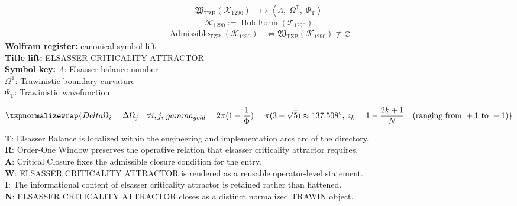 \noindent
\begin{minipage}[t]{0.48\linewidth}
\begingroup
\small
\[
\begin{aligned}
\mathfrak{W}_{\mathrm{TZP}}\!\left(\mathcal{K}_{1290}\right)
&\longmapsto
\left\langle \Lambda,\; \Omega^{\mathbb{T}},\; \Psi_{\mathrm{T}} \right\rangle
\end{aligned}
\]
\[
\mathcal{K}_{1290}
:=
\operatorname{HoldForm}\!\left(\mathcal{T}_{1290}\right)
\]
\[
\begin{aligned}
\operatorname{Admissible}_{\mathrm{TZP}}\!\left(\mathcal{K}_{1290}\right)
&\Longleftrightarrow
\mathfrak{W}_{\mathrm{TZP}}\!\left(\mathcal{K}_{1290}\right)\not\equiv\varnothing
\end{aligned}
\]
\textbf{Wolfram register:} canonical symbol lift\\
\textbf{Title lift:} ELSASSER CRITICALITY ATTRACTOR\\
\textbf{Symbol key:} \(\Lambda\): Elsasser balance number\\ \(\Omega^{\mathbb{T}}\): Trawinistic boundary curvature\\ \(\Psi_{\mathrm{T}}\): Trawinistic wavefunction
\par
\endgroup
\end{minipage}\hfill
\begin{minipage}[t]{0.48\linewidth}
\[
\tzpnormalizewrap{Delta \Omega_i = \Delta \Omega_j \quad \forall i, j,\,gamma_{gold} = 2\pi (1 - \frac{1}{\Phi}) = \pi(3 - \sqrt{5}) \approx 137.508^\circ,\,z_k = 1 - \frac{2k+1}{N} \quad (\text{ranging from } +1 \text{ to } -1)}
\]

\small
\textbf{T}: Elsasser Balance is localized within the engineering and implementation arcs arc of the directory.\\
\textbf{R}: Order-One Window preserves the operative relation that elsasser criticality attractor requires.\\
\textbf{A}: Critical Closure fixes the admissible closure condition for the entry.\\
\textbf{W}: ELSASSER CRITICALITY ATTRACTOR is rendered as a reusable operator-level statement.\\
\textbf{I}: The informational content of elsasser criticality attractor is retained rather than flattened.\\
\textbf{N}: ELSASSER CRITICALITY ATTRACTOR closes as a distinct normalized TRAWIN object.
\normalsize
\end{minipage}

